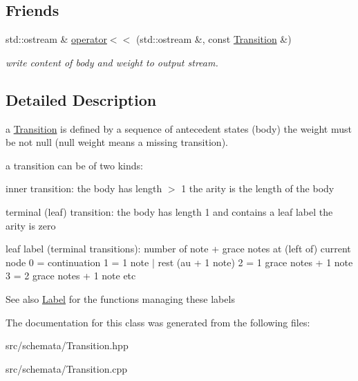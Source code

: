 \subsection*{Friends}
\begin{DoxyCompactItemize}
\item 
\mbox{\label{classTransition_ab24951c64864296cfb8a1dc4402a0f43}} 
std\+::ostream \& \mbox{\hyperlink{classTransition_ab24951c64864296cfb8a1dc4402a0f43}{operator$<$$<$}} (std\+::ostream \&, const \mbox{\hyperlink{classTransition}{Transition}} \&)
\begin{DoxyCompactList}\small\item\em write content of body and weight to output stream. \end{DoxyCompactList}\end{DoxyCompactItemize}


\subsection{Detailed Description}
a \mbox{\hyperlink{classTransition}{Transition}} is defined by a sequence of antecedent states (body) the weight must be not null (null weight means a missing transition). 

a transition can be of two kinds\+:
\begin{DoxyItemize}
\item inner transition\+: the body has length $>$ 1 the arity is the length of the body
\item terminal (leaf) transition\+: the body has length 1 and contains a leaf label the arity is zero
\end{DoxyItemize}

leaf label (terminal transitions)\+: number of note + grace notes at (left of) current node 0 = continuation 1 = 1 note $\vert$ rest (au + 1 note) 2 = 1 grace notes + 1 note 3 = 2 grace notes + 1 note etc \begin{DoxySeeAlso}{See also}
\mbox{\hyperlink{classLabel}{Label}} for the functions managing these labels 
\end{DoxySeeAlso}


The documentation for this class was generated from the following files\+:\begin{DoxyCompactItemize}
\item 
src/schemata/Transition.\+hpp\item 
src/schemata/Transition.\+cpp\end{DoxyCompactItemize}
